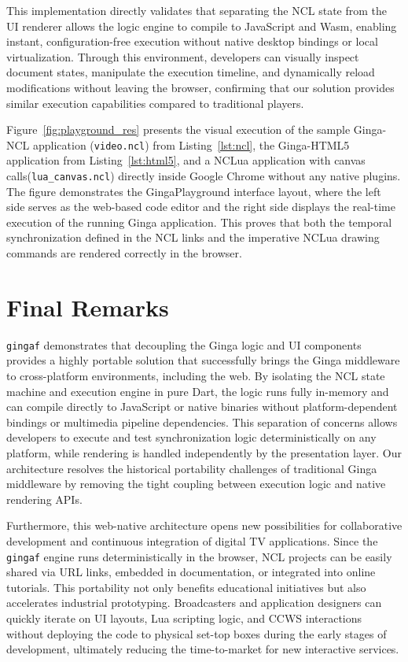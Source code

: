 \documentclass[sigconf,authorversion,review,authordraft]{webmedia}
\newcommand{\projectname}{\texttt{gingaf}}
\begin{document}
This implementation directly validates that separating the NCL state from the UI renderer allows the logic engine to compile to JavaScript and Wasm, enabling instant, configuration-free execution without native desktop bindings or local virtualization. Through this environment, developers can visually inspect document states, manipulate the execution timeline, and dynamically reload modifications without leaving the browser, confirming that our solution provides similar execution capabilities compared to traditional players.

Figure~\ref{fig:playground_res} presents the visual execution of the sample Ginga-NCL application (\texttt{video.ncl}) from Listing~\ref{lst:ncl}, the Ginga-HTML5 application from Listing~\ref{lst:html5}, and a NCLua application with canvas calls(\texttt{lua\_canvas.ncl}) directly inside Google Chrome without any native plugins. The figure demonstrates the GingaPlayground interface layout, where the left side serves as the web-based code editor and the right side displays the real-time execution of the running Ginga application. This proves that both the temporal synchronization defined in the NCL links and the imperative NCLua drawing commands are rendered correctly in the browser.

\section{Final Remarks}
\label{sec:remarks}

\projectname{} demonstrates that decoupling the Ginga logic and UI components provides a highly portable solution that successfully brings the Ginga middleware to cross-platform environments, including the web. By isolating the NCL state machine and execution engine in pure Dart, the logic runs fully in-memory and can compile directly to JavaScript or native binaries without platform-dependent bindings or multimedia pipeline dependencies. This separation of concerns allows developers to execute and test synchronization logic deterministically on any platform, while rendering is handled independently by the presentation layer. Our architecture resolves the historical portability challenges of traditional Ginga middleware by removing the tight coupling between execution logic and native rendering APIs.

Furthermore, this web-native architecture opens new possibilities for collaborative development and continuous integration of digital TV applications. Since the \projectname{} engine runs deterministically in the browser, NCL projects can be easily shared via URL links, embedded in documentation, or integrated into online tutorials. This portability not only benefits educational initiatives but also accelerates industrial prototyping. Broadcasters and application designers can quickly iterate on UI layouts, Lua scripting logic, and CCWS interactions without deploying the code to physical set-top boxes during the early stages of development, ultimately reducing the time-to-market for new interactive services.
\end{document}
